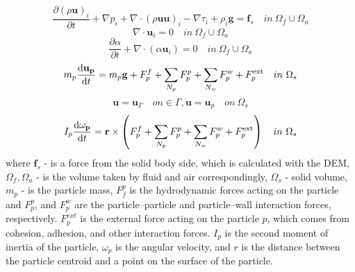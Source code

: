 \begin{equation}
    \frac{\partial (\rho \mathbf{u})_i}{\partial t} + \nabla p_i  +  \nabla \cdot(\rho \mathbf{u}\mathbf{u})_i - \nabla \tau_i + \rho_i \mathbf{g} = \mathbf{f}_{s} \quad in ~\Omega_f \cup \Omega_a
\end{equation}
\begin{equation}
    \nabla\cdot \mathbf{u}_i = 0 \quad in ~\Omega_f \cup \Omega_a
\end{equation}
\begin{equation}
    \frac{\partial \alpha}{\partial t} + \nabla\cdot(\alpha\mathbf{u}_i) = 0 \quad in ~\Omega_f \cup \Omega_a
\end{equation}
\begin{equation}
    m_{p} \frac{\mathrm{d} \mathbf{u}_{\mathbf{p}}}{\mathrm{d} t}=m_{p} \mathbf{g}+F_{p}^{f}+\sum_{N_{p}} F_{p}^{p}+\sum_{N_{w}} F_{p}^{w}+F_{p}^{\mathrm{ext}} \\ \quad in ~\Omega_s
\end{equation}
\begin{equation}
    \mathbf{u} = \mathbf{u}_{\Gamma} \quad on \in \Gamma, \mathbf{u} = \mathbf{u}_p \quad on ~\Omega_s
\end{equation}
\begin{equation}
I_{p} \frac{\mathrm{d} \omega_{\mathbf{p}}}{\mathrm{d} t}=\mathbf{r} \times\left(F_{p}^{f}+\sum_{N_{p}} F_{p}^{p}+\sum_{N_{w}} F_{p}^{w}+F_{p}^{\mathrm{ext}}\right)\\ \quad in ~\Omega_s
\end{equation}
where  $\mathbf{f}_{s}$ - is a force from the solid body side, which is calculated with the DEM, $\Omega_f,\Omega_a$ -  is the volume taken by fluid and air correspondingly, $\Omega_s$ - solid volume, $m_p$ - is the particle mass, $F^p_f$ is the hydrodynamic forces acting on the particle and $F^p_p$, and $F^w_p$ are the particle–particle and particle–wall interaction forces, respectively. $F^{ext}_p$ is the external force acting on the particle $p$, which comes from cohesion, adhesion, and other interaction forces. $I_p$ is the second moment of inertia of the particle, ${\omega}_p$ is the angular velocity, and $r$ is the distance between the particle centroid and a point on the surface of the particle. 

